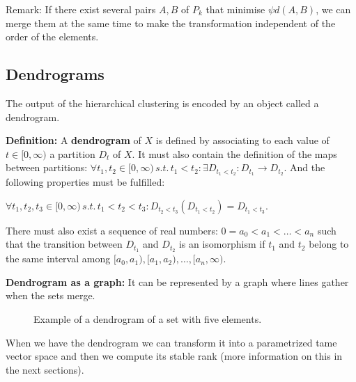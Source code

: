 \documentclass[11pt,a4paper]{article}
\begin{document}
Remark: If there exist several pairs $A,B$ of $P_k$ that minimise $\psi d(A,B)$, we can merge them at the same time to make the transformation independent of the order of the elements.


\subsection{Dendrograms}
The output of the hierarchical clustering is encoded by an object called a dendrogram.

\textbf{Definition:}
A \textbf{dendrogram} of $X$ is defined by associating to each value of $t \in [0,\infty)$ a partition $D_t$ of $X$. It must also contain the definition of the maps between partitions: $\forall t_1, t_2 \in [0,\infty) \, s.t. \, t_1<t_2: \exists D_{t_1<t_2}: D_{t_1} \rightarrow D_{t_2}$. And the following properties must be fulfilled:

$\forall t_1, t_2, t_3 \in [0,\infty) \, s.t. \, t_1<t_2<t_3:  D_{t_2<t_3} (D_{t_1<t_2}) = D_{t_1<t_3}$.

There must also exist a sequence of real numbers: $0=a_0<a_1<\dots<a_n$ such that the transition between $D_{t_1}$ and $D_{t_2}$ is an isomorphism if $t_1$ and $t_2$ belong to the same interval among $[a_0,a_1),[a_1,a_2),\dots,[a_n,\infty)$.

\textbf{Dendrogram as a graph:}
It can be represented by a graph where lines gather when the sets merge.

\begin{figure}[H]
    \centering
    \caption{Example of a dendrogram of a set with five elements.}
    \label{fig:dendrogram}
\end{figure}

When we have the dendrogram we can transform it into a parametrized tame vector space and then we compute its stable rank (more information on this in the next sections).
\end{document}

